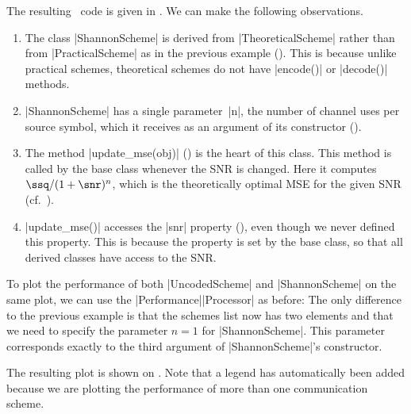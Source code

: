 The resulting \matlab\ code is given in . We can make the
following observations.
\begin{enumerate}
  \item The class |ShannonScheme| is derived from |TheoreticalScheme| rather
    than from |PracticalScheme| as in the previous example (). This
    is because unlike practical schemes, theoretical schemes do not have
    |encode()| or |decode()| methods. 
    
  \item |ShannonScheme| has a single parameter~|n|, the number of channel uses
    per source symbol, which it receives as an argument of its constructor
    ().

  \item The method |update_mse(obj)| () is the heart of this
    class. This method is called by the base class whenever the SNR is
    changed. Here it computes $\ssq / (1
    + \snr)^n$, which is the theoretically optimal MSE for the given SNR
    (cf.~).
    
  \item |update_mse()| accesses the |snr| property (), even though
    we never defined this property. This is because the property is set by the
    base class, so that all derived classes have access to the SNR.
\end{enumerate}

To plot the performance of both |UncodedScheme| and |ShannonScheme| on the same
plot, we can use the |Performance|\-|Processor| as before:
The only difference to the previous example is that the schemes list now has two
elements and that we need to specify the parameter $n=1$ for |ShannonScheme|.
This parameter corresponds exactly to the third argument of |ShannonScheme|'s
constructor.

The resulting plot is shown on . Note that a legend has
automatically been added because we are plotting the performance of more than
one communication scheme.


